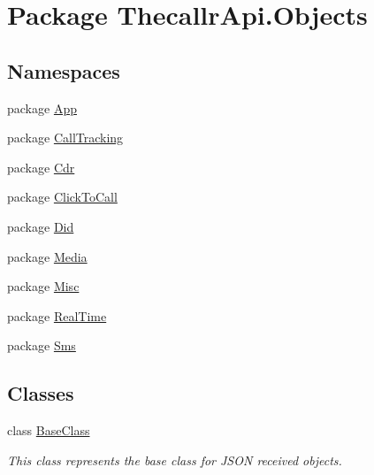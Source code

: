 \hypertarget{namespace_thecallr_api_1_1_objects}{\section{Package Thecallr\+Api.\+Objects}
\label{namespace_thecallr_api_1_1_objects}
}
\subsection*{Namespaces}
\begin{DoxyCompactItemize}
\item 
package \hyperlink{namespace_thecallr_api_1_1_objects_1_1_app}{App}
\item 
package \hyperlink{namespace_thecallr_api_1_1_objects_1_1_call_tracking}{Call\+Tracking}
\item 
package \hyperlink{namespace_thecallr_api_1_1_objects_1_1_cdr}{Cdr}
\item 
package \hyperlink{namespace_thecallr_api_1_1_objects_1_1_click_to_call}{Click\+To\+Call}
\item 
package \hyperlink{namespace_thecallr_api_1_1_objects_1_1_did}{Did}
\item 
package \hyperlink{namespace_thecallr_api_1_1_objects_1_1_media}{Media}
\item 
package \hyperlink{namespace_thecallr_api_1_1_objects_1_1_misc}{Misc}
\item 
package \hyperlink{namespace_thecallr_api_1_1_objects_1_1_real_time}{Real\+Time}
\item 
package \hyperlink{namespace_thecallr_api_1_1_objects_1_1_sms}{Sms}
\end{DoxyCompactItemize}
\subsection*{Classes}
\begin{DoxyCompactItemize}
\item 
class \hyperlink{class_thecallr_api_1_1_objects_1_1_base_class}{Base\+Class}
\begin{DoxyCompactList}\small\item\em This class represents the base class for J\+S\+O\+N received objects. \end{DoxyCompactList}\end{DoxyCompactItemize}
